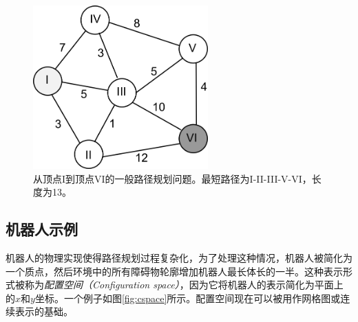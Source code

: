 \begin{figure}[!htb]
\centering
\includegraphics[width=0.6\textwidth]{figs/dijkstra}
\caption{从顶点I到顶点VI的一般路径规划问题。最短路径为I-II-III-V-VI，长度为13。}
\label{fig:pathproblem}
\end{figure}

\subsection{机器人示例}

机器人的物理实现使得路径规划过程复杂化，为了处理这种情况，机器人被简化为一个质点，然后环境中的所有障碍物轮廓增加机器人最长体长的一半。这种表示形式被称为\emph{配置空间（Configuration space）}，因为它将机器人的表示简化为平面上的$x$和$y$坐标。一个例子如图\ref{fig:cspace}所示。配置空间现在可以被用作网格图或连续表示的基础。

